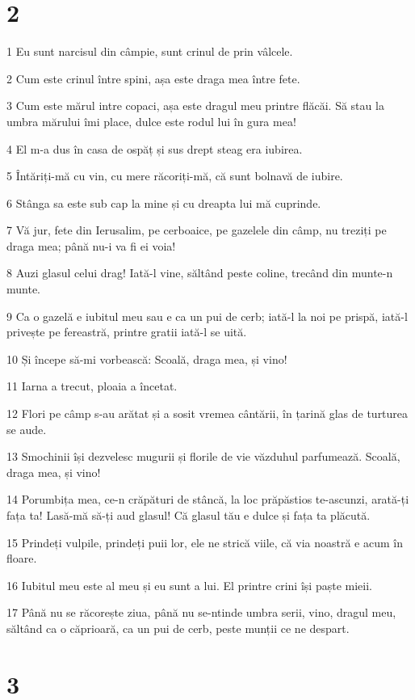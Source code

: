 \chapter{2}

\par 1 Eu sunt narcisul din câmpie, sunt crinul de prin vâlcele.
\par 2 Cum este crinul între spini, așa este draga mea între fete.
\par 3 Cum este mărul intre copaci, așa este dragul meu printre flăcăi. Să stau la umbra mărului îmi place, dulce este rodul lui în gura mea!
\par 4 El m-a dus în casa de ospăț și sus drept steag era iubirea.
\par 5 Întăriți-mă cu vin, cu mere răcoriți-mă, că sunt bolnavă de iubire.
\par 6 Stânga sa este sub cap la mine și cu dreapta lui mă cuprinde.
\par 7 Vă jur, fete din Ierusalim, pe cerboaice, pe gazelele din câmp, nu treziți pe draga mea; până nu-i va fi ei voia!
\par 8 Auzi glasul celui drag! Iată-l vine, săltând peste coline, trecând din munte-n munte.
\par 9 Ca o gazelă e iubitul meu sau e ca un pui de cerb; iată-l la noi pe prispă, iată-l privește pe fereastră, printre gratii iată-l se uită.
\par 10 Și începe să-mi vorbească: Scoală, draga mea, și vino!
\par 11 Iarna a trecut, ploaia a încetat.
\par 12 Flori pe câmp s-au arătat și a sosit vremea cântării, în țarină glas de turturea se aude.
\par 13 Smochinii își dezvelesc mugurii și florile de vie văzduhul parfumează. Scoală, draga mea, și vino!
\par 14 Porumbița mea, ce-n crăpături de stâncă, la loc prăpăstios te-ascunzi, arată-ți fața ta! Lasă-mă să-ți aud glasul! Că glasul tău e dulce și fața ta plăcută.
\par 15 Prindeți vulpile, prindeți puii lor, ele ne strică viile, că via noastră e acum în floare.
\par 16 Iubitul meu este al meu și eu sunt a lui. El printre crini își paște mieii.
\par 17 Până nu se răcorește ziua, până nu se-ntinde umbra serii, vino, dragul meu, săltând ca o căprioară, ca un pui de cerb, peste munții ce ne despart.

\chapter{3}


